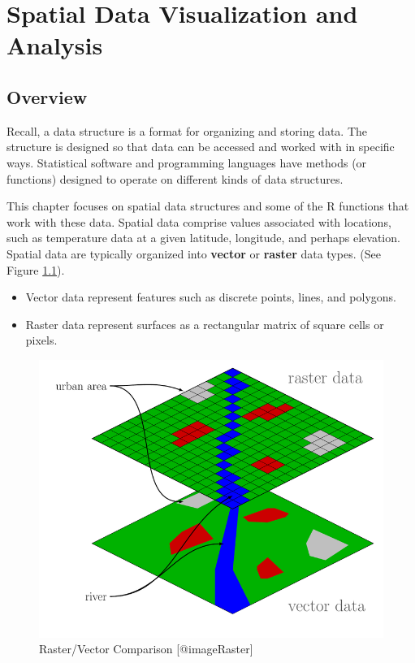 \documentclass[]{krantz}
\providecommand{\tightlist}{%
  \setlength{\itemsep}{0pt}\setlength{\parskip}{0pt}}
\begin{document}
\chapter{Spatial Data Visualization and Analysis}\label{sp}

\section{Overview}\label{overview}

Recall, a data structure is a format for organizing and storing data.
The structure is designed so that data can be accessed and worked with
in specific ways. Statistical software and programming languages have
methods (or functions) designed to operate on different kinds of data
structures.

This chapter focuses on spatial data structures and some of the R
functions that work with these data. Spatial data comprise values
associated with locations, such as temperature data at a given latitude,
longitude, and perhaps elevation. Spatial data are typically organized
into \textbf{vector} or \textbf{raster} data types. (See Figure
\ref{fig:raster}).

\begin{itemize}
\tightlist
\item
  Vector data represent features such as discrete points, lines, and
  polygons.
\item
  Raster data represent surfaces as a rectangular matrix of square cells
  or pixels.
\end{itemize}

\begin{figure}

{\centering \includegraphics[width=1\linewidth]{../figures/Raster_vector_tikz} 

}

\caption{Raster/Vector Comparison [@imageRaster]}\label{fig:raster}
\end{figure}
\end{document}
